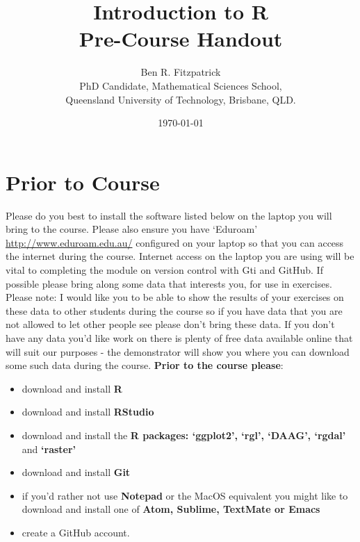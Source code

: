 \documentclass{article}[12pt]
\begin{document}
\title{\huge Introduction to R \\
 \large Pre-Course Handout}


\author{Ben R. Fitzpatrick\\ 
\small PhD Candidate, Mathematical Sciences School,\\
\small Queensland University of Technology, Brisbane, QLD.}
\date{\today}
\maketitle

\section*{Prior to Course}
Please do you best to install the software listed below on the laptop you will bring to the course.
Please also ensure you have `Eduroam' \url{http://www.eduroam.edu.au/} configured on your laptop so that you can access the internet during the course.  
Internet access on the laptop you are using will be vital to completing the module on version control with Gti and GitHub.
If possible please bring along some data that interests you, for use in exercises.
Please note: I would like you to be able to show the results of your exercises on these data to other students during the course so if you have data that you are not allowed to let other people see please don't bring these data.
If you don't have any data you'd like work on there is plenty of free data available online that will suit our purposes - the demonstrator will show you where you can download some such data during the course.
\newline
\newline
\textbf{Prior to the course please}: \begin{itemize}
\item download and install \textbf{R}
\item download and install \textbf{RStudio}
\item download and install the \textbf{R packages: `ggplot2', `rgl', `DAAG', `rgdal'} and \textbf{`raster'}
\item download and install \textbf{Git}
\item if you'd rather not use \textbf{Notepad} or the MacOS equivalent you might like to download and install one of \textbf{Atom, Sublime, TextMate or Emacs}
\item create a GitHub account. \end{itemize}
\end{document}
